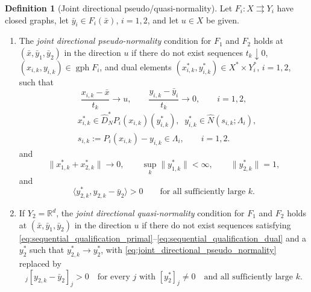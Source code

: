 \documentclass[12pt,twoside,reqno]{amsart}
\theoremstyle{definition}
\newtheorem{definition}[theorem]{Definition}
\numberwithin{equation}{section}
\begin{document}
\begin{definition}[Joint directional pseudo/quasi-normality]\label{defn:joint_directional_pseudo_normality}
Let $F_i:X\rightrightarrows Y_i$ have closed graphs, let $\bar{y}_i\in F_i(\bar{x})$, $i=1,2$, and let $u\in X$ be given.

\begin{enumerate}
\item[(i)] The \emph{joint directional pseudo-normality} condition for $F_1$ and $F_2$ holds at $(\bar{x},\bar{y}_1,\bar{y}_2)$ in the direction $u$ if there do not exist sequences $t_k\downarrow0$, $(x_{i,k},y_{i,k})\in\operatorname{gph}F_i$, and dual elements $(x_{i,k}^*,y_{i,k}^*)\in X^*\times Y_i^*$, $i=1,2$, such that
\begin{equation}\label{eq:sequential_qualification_primal}
    \frac{x_{i,k}-\bar{x}}{t_k}\to u,
    \qquad
    \frac{y_{i,k}-\bar{y}_i}{t_k}\to0,
    \qquad i=1,2,
\end{equation}
\begin{equation}\label{eq:sequential_decoupled_normals}
\begin{aligned}
    &x_{i,k}^*\in \widehat D_N^*P_i(x_{i,k})(y_{i,k}^*),\;\; 
    y_{i,k}^*\in \widehat N(s_{i,k};\Lambda_i),\\
    &s_{i,k}:=P_i(x_{i,k})-y_{i,k}\in\Lambda_i,
    \qquad i=1,2.
\end{aligned}
\end{equation}
and
\begin{equation}\label{eq:sequential_qualification_dual}
    \|x_{1,k}^*+x_{2,k}^*\|\to0,
    \qquad
    \sup_k\|y_{1,k}^*\|<\infty,
    \qquad
    \|y_{2,k}^*\|=1,
\end{equation}
and
\begin{equation}\label{eq:joint_directional_pseudo_normality}
    \langle y_{2,k}^*,y_{2,k}-\bar{y}_2\rangle>0
    \qquad\text{for all sufficiently large }k.
\end{equation}

\item[(ii)] If $Y_2=\mathbb R^d$, the \emph{joint directional quasi-normality} condition for $F_1$ and $F_2$ holds at $(\bar{x},\bar{y}_1,\bar{y}_2)$ in the direction $u$ if there do not exist sequences satisfying \eqref{eq:sequential_qualification_primal}--\eqref{eq:sequential_qualification_dual} and a $y_2^*$ such that $y_{2,k}^*\to y_2^*$, with \eqref{eq:joint_directional_pseudo_normality} replaced by
\begin{equation*}
    [y_2^*]_j[y_{2,k}-\bar{y}_2]_j>0
    \quad\text{for every }j\text{ with }[y_2^*]_j\ne0
    \quad\text{and all sufficiently large }k.
\end{equation*}
\end{enumerate}
\end{definition}
\end{document}
